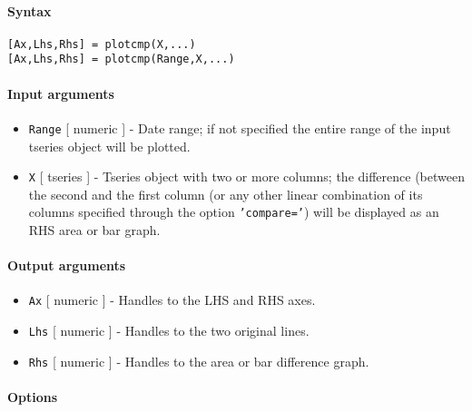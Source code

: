 


	\paragraph{Syntax}\label{syntax}

\begin{verbatim}
[Ax,Lhs,Rhs] = plotcmp(X,...)
[Ax,Lhs,Rhs] = plotcmp(Range,X,...)
\end{verbatim}

\paragraph{Input arguments}\label{input-arguments}

\begin{itemize}
\item
  \texttt{Range} {[} numeric {]} - Date range; if not specified the
  entire range of the input tseries object will be plotted.
\item
  \texttt{X} {[} tseries {]} - Tseries object with two or more columns;
  the difference (between the second and the first column (or any other
  linear combination of its columns specified through the option
  \texttt{'compare='}) will be displayed as an RHS area or bar graph.
\end{itemize}

\paragraph{Output arguments}\label{output-arguments}

\begin{itemize}
\item
  \texttt{Ax} {[} numeric {]} - Handles to the LHS and RHS axes.
\item
  \texttt{Lhs} {[} numeric {]} - Handles to the two original lines.
\item
  \texttt{Rhs} {[} numeric {]} - Handles to the area or bar difference
  graph.
\end{itemize}

\paragraph{Options}\label{options}

